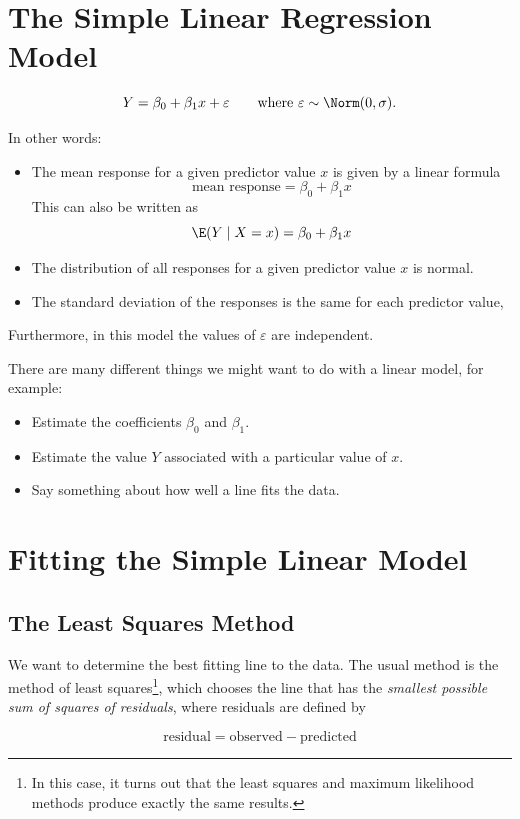 \documentclass[twoside]{book}\usepackage[]{graphicx}\usepackage[]{xcolor}
\newcounter{example}[section]
\begin{document}
\section{The Simple Linear Regression Model}

\[
Y = \beta_0 + \beta_1 x + \varepsilon  \qquad \mbox{where $\varepsilon \sim \Norm(0,\sigma)$.}
\]

In other words:
\begin{itemize}
\item
The mean response for a given predictor value $x$ is given by a linear formula
\[
\mbox{mean response} = \beta_0 + \beta_1 x
\]
This can also be written as 
\[
\E(Y \mid X = x) = \beta_0 + \beta_1 x
\]
\item
The distribution of all responses for a given predictor value $x$ is normal.
\item
The standard deviation of the responses is the same for each predictor value,
\end{itemize}
Furthermore, in this model the values of $\varepsilon$ are independent.

There are many different things we might want to do with a linear model, for example:
\begin{itemize}
	\item Estimate the coefficients $\beta_0$ and $\beta_1$.
	\item Estimate the value $Y$ associated with a particular value of $x$.
	\item Say something about how well a line fits the data.
\end{itemize}

\section{Fitting the Simple Linear Model}

\subsection{The Least Squares Method}

We want to determine the best fitting line to the data.  The usual method is 
the method of least squares\footnote{In this case, it turns out that the least 
squares and maximum likelihood methods produce exactly the same results.},
which chooses the line that has the 
\emph{ smallest possible sum of squares of residuals}, where residuals are defined by

\[
\mbox{residual} = \mbox{observed} - \mbox{predicted}
\]
\end{document}
